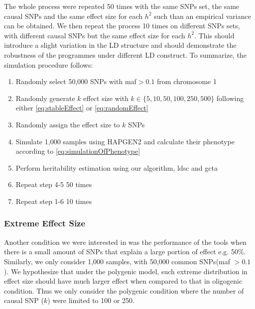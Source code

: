 		The whole process were repeated 50 times with the same \glspl{SNP} set, the same causal \glspl{SNP} and the same effect size for each $h^2$ such than an empirical variance can be obtained.
		We then repeat the process 10 times on different \glspl{SNP} sets, with different causal \glspl{SNP} but the same effect size for each $h^2$.
		This should introduce a slight variation in the \gls{LD} structure and should demonstrate the robustness of the programmes under different \gls{LD} construct.
		To summarize, the simulation procedure follows:
		\begin{enumerate}
			\item Randomly select 50,000 \glspl{SNP} with \gls{maf}$>0.1$ from chromosome 1
			\item Randomly generate $k$ effect size with $k \in \{5,10,50,100,250,500\}$ following either \cref{eq:stableEffect} or \cref{eq:randomEffect}
			\item Randomly assign the effect size to $k$ \glspl{SNP}
			\item Simulate 1,000 samples using HAPGEN2 and calculate their phenotype according to \cref{eq:simulationOfPhenotype}
			\item Perform heritability estimation using our algorithm, \gls{ldsc} and \gls{gcta}
			\item Repeat step 4-5 50 times
			\item Repeat step 1-6 10 times
		\end{enumerate}
		
		\subsubsection{Extreme Effect Size}
		Another condition we were interested in was the performance of the tools when there is a small amount of \glspl{SNP} that explain a large portion of effect e.g. 50\%.
		Similarly, we only consider 1,000 samples, with 50,000 common \glspl{SNP}(\gls{maf} $>0.1$).
		We hypothesize that under the polygenic model, such extreme distribution in effect size should have much larger effect when compared to that in oligogenic condition. 
		Thus we only consider the polygenic condition where the number of causal \gls{SNP} ($k$) were limited to 100 or 250. 
		

